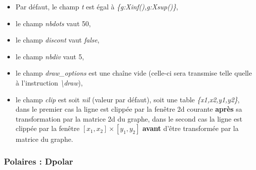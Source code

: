 \begin{itemize}
  \begin{itemize}
      \item Par défaut, le champ \emph{t} est égal à \emph{\{g:Xinf(),g:Xsup()\}},
      \item le champ \emph{nbdots} vaut 50, 
      \item le champ \emph{discont} vaut \emph{false},
      \item le champ \emph{nbdiv} vaut 5,
      \item le champ \emph{draw\_options} est une chaîne vide (celle-ci sera transmise telle quelle à l'instruction \emph{\textbackslash draw}),
      \item le champ \emph{clip} est soit \emph{nil} (valeur par défaut), soit une table \emph{\{x1,x2,y1,y2\}}, dans le premier cas la ligne est clippée par la fenêtre 2d courante \textbf{après} sa transformation par la matrice 2d du graphe, dans le second cas la ligne est clippée par la fenêtre $[x_1,x_2]\times[y_1,y_2]$ \textbf{avant} d'être transformée par la matrice du graphe.
  \end{itemize}
\end{itemize}  

\subsubsection{Polaires : Dpolar}

